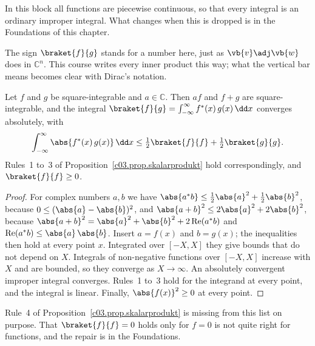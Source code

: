 \begin{vertiefung}
  In this block all functions are piecewise continuous, so that every integral is an ordinary
  improper integral. What changes when this is dropped is in the Foundations of this
  chapter.


  The sign $\braket{f}{g}$ stands for a number here, just as $\vb{v}\adj\vb{w}$ does in
  $\mathbb{C}^n$. This course writes every inner product this way; what the vertical bar
  means becomes clear with Dirac's notation.

  \begin{proposition}\label{c03.prop.ltwo}
    Let $f$ and $g$ be square-integrable and $a \in \mathbb{C}$. Then $af$ and $f + g$ are
    square-integrable, and the integral
    $\braket{f}{g} = \int_{-\infty}^{\infty} f^*(x)\, g(x)\, \dd x$ converges absolutely, with
    \begin{equation}\label{c03.eq.ltwo}
      \int_{-\infty}^{\infty} \abs{f^*(x)\, g(x)}\, \dd x
      \leq \tfrac12 \braket{f}{f} + \tfrac12 \braket{g}{g} .
    \end{equation}
    Rules~1 to~3 of Proposition~\ref{c03.prop.skalarprodukt} hold correspondingly, and
    $\braket{f}{f} \geq 0$.
  \end{proposition}
  \begin{proof}
    For complex numbers $a, b$ we have $\abs{a^* b} \leq \tfrac12 \abs{a}^2 + \tfrac12 \abs{b}^2$,
    because $0 \leq (\abs{a} - \abs{b})^2$, and $\abs{a + b}^2 \leq 2\abs{a}^2 + 2\abs{b}^2$,
    because $\abs{a + b}^2 = \abs{a}^2 + \abs{b}^2 + 2 \operatorname{Re}(a^* b)$ and
    $\operatorname{Re}(a^* b) \leq \abs{a}\,\abs{b}$. Insert $a = f(x)$ and $b = g(x)$; the
    inequalities then hold at every point $x$. Integrated over $[-X, X]$ they give bounds that do not depend on $X$.
    Integrals of non-negative functions over $[-X, X]$ increase with $X$ and are bounded, so
    they converge as $X \to \infty$. An absolutely convergent improper integral converges.
    Rules~1 to~3 hold for the integrand at every point, and the integral is linear. Finally,
    $\abs{f(x)}^2 \geq 0$ at every point.
  \end{proof}

  Rule~4 of Proposition~\ref{c03.prop.skalarprodukt} is missing from this list on purpose.
  That $\braket{f}{f} = 0$ holds only for $f = 0$ is not quite right for functions, and the
  repair is in the Foundations.


\end{vertiefung}
